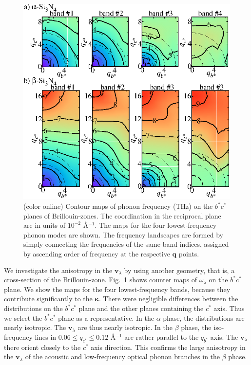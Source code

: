 \documentclass[twocolumn,amsmath,amssymb,a4paper,prb,superscriptaddress,floatfix]{revtex4-1}
\begin{document}
\begin{figure}[ht]
 \centerins
  \includegraphics[width=\linewidth]{Fig2_small.eps} \caption{(color
  online) Contour maps of phonon frequency (THz) on the $b^*c^*$
  planes of Brillouin-zones. The coordination in the reciprocal plane 
   are in units of $10^{-2}$ \AA$^{-1}$. The maps for the four lowest-frequency
  phonon modes are shown. The frequency landscapes are formed by simply
  connecting the frequencies of the same band indices, assigned by
  ascending order of frequency at the respective $\mathbf {q}$
  points. \label{fig:Fig3_338} }
 \centering
\end{figure}

We investigate the anisotropy in the $\mathbf{v}_{\lambda}$ by using another
geometry, that is, a cross-section of the Brillouin-zone.
Fig.~\ref{fig:Fig3_338} shows counter maps of $\omega_{\lambda}$  on the
$b^*c^*$ plane.  We show the maps for the four lowest-frequency bands, because
they contribute significantly to the $\boldsymbol{\kappa}$. There were
negligible differences between the distributions on the $b^*c^*$ plane and the
other planes containing the $c^*$ axis.  Thus we select the $b^*c^*$ plane as a
representative.  In the $\alpha$ phase, the distributions are nearly isotropic.
The $\mathbf{v}_{\lambda}$ are thus nearly isotropic. In the $\beta$ phase, the
iso-frequency lines in $0.06 \le q_{c^*} \le 0.12$ \AA$^{-1}$ are rather
parallel to the $q_{b^*}$ axis.  The $\mathbf{v}_{\lambda}$ there orient
closely to the $c^*$ axis direction. This confirms the large anisotropy in the
$\mathbf{v}_{\lambda}$ of the acoustic and low-frequency optical phonon branches
in the $\beta$ phase.
\end{document}
